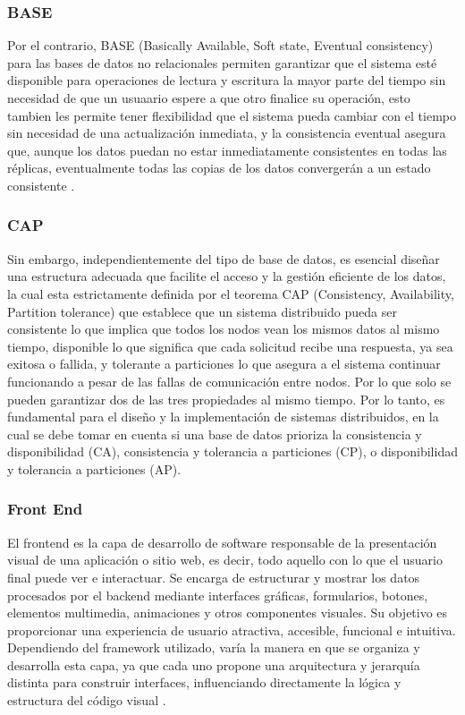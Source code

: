 \subsubsection{BASE}

Por el contrario, BASE (Basically Available, Soft state, Eventual consistency) para las bases de datos no relacionales
permiten garantizar que el sistema esté disponible para operaciones de lectura y escritura la mayor parte del tiempo 
sin necesidad de que un usuaario espere a que otro finalice su operación,
esto tambien les permite tener flexibilidad que el sistema pueda cambiar con el tiempo sin necesidad de una actualización inmediata,
y la consistencia eventual asegura que, aunque los datos puedan no estar inmediatamente consistentes en todas las réplicas, 
eventualmente todas las copias de los datos convergerán a un estado consistente \cite{Silberschatz2006}.

\subsubsection{CAP}

Sin embargo, independientemente del tipo de base de datos, es esencial diseñar una estructura adecuada que facilite el acceso 
y la gestión eficiente de los datos, la cual esta estrictamente definida por el teorema CAP (Consistency, Availability, Partition tolerance)
que establece que un sistema distribuido pueda ser consistente lo que implica que todos los nodos vean los mismos datos al mismo tiempo,
disponible lo que significa que cada solicitud recibe una respuesta, ya sea exitosa o fallida,
y tolerante a particiones lo que asegura a el sistema continuar funcionando a pesar de las fallas de comunicación entre nodos.
Por lo que solo se pueden garantizar dos de las tres propiedades al mismo tiempo. 
Por lo tanto, es fundamental para el diseño y la implementación de sistemas distribuidos, en la cual 
se debe tomar en cuenta si una base de datos prioriza la consistencia y disponibilidad (CA), 
consistencia y tolerancia a particiones (CP), o disponibilidad y tolerancia a particiones (AP)\cite{Araneda2022}.


\subsubsection{Front End}
El frontend es la capa de desarrollo de software responsable de la presentación
visual de una aplicación o sitio web, es decir, todo aquello con lo que el usuario final
puede ver e interactuar. Se encarga de estructurar y mostrar los datos procesados
por el backend mediante interfaces gráficas, formularios, botones, elementos
multimedia, animaciones y otros componentes visuales. Su objetivo es proporcionar una experiencia de usuario atractiva, accesible, funcional e intuitiva.
Dependiendo del framework utilizado, varía la manera en que se organiza y
desarrolla esta capa, ya que cada uno propone una arquitectura y jerarquía distinta
para construir interfaces, influenciando directamente la lógica y estructura del
código visual \cite{CampaGarcia2024} \cite{Casteleyn2009}.

